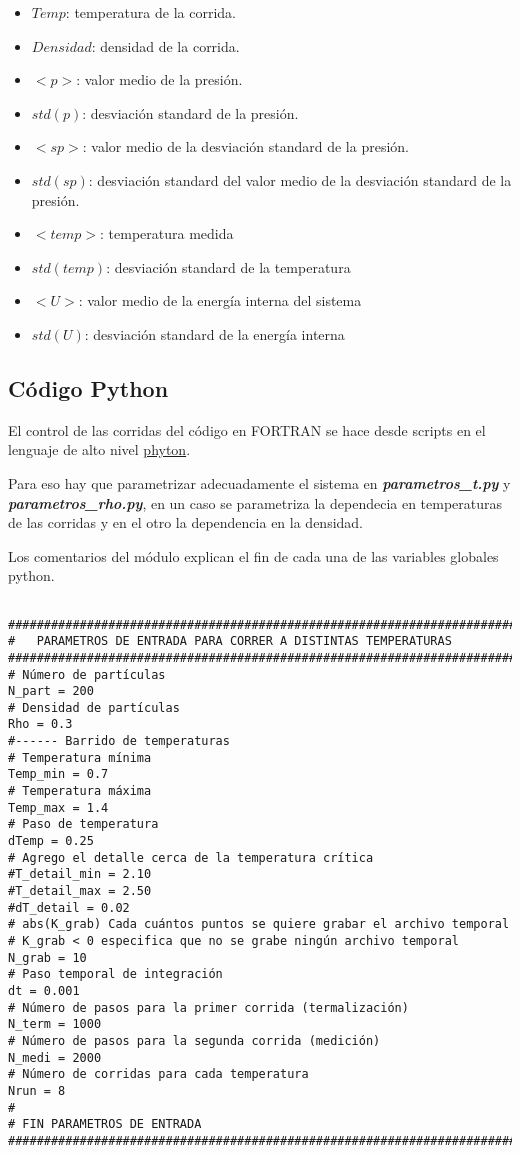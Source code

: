 \begin{itemize}

\item $Temp$: temperatura de la corrida.      
\item $Densidad$: densidad de la corrida.       
\item $<p>$: valor medio de la presión.      
\item $std(p)$: desviación standard de la presión.       
\item $<sp>$: valor medio de la desviación standard de la presión.       
\item $std(sp)$: desviación standard del valor medio de la desviación standard de la presión.    
\item $<temp>$: temperatura medida      
\item $std(temp)$: desviación standard de la temperatura       
\item $<U>$: valor medio de la energía interna del sistema       
\item $std(U)$: desviación standard de la energía interna
\end{itemize}



\subsection{Código Python}

El control de las corridas del código en FORTRAN se hace desde scripts en el lenguaje
de alto nivel  \href{http://www.python.org/}{phyton}. 

Para eso hay que parametrizar adecuadamente el sistema en \textbf{\textit{parametros\_t.py}} y 
\textbf{\textit{parametros\_rho.py}}, en un caso se parametriza la dependecia en temperaturas
de las corridas y en el otro la dependencia en la densidad.
 
Los comentarios del módulo explican el fin de cada una de las variables globales python.

\begin{verbatim}

###############################################################################       
#   PARAMETROS DE ENTRADA PARA CORRER A DISTINTAS TEMPERATURAS
###############################################################################
# Número de partículas
N_part = 200
# Densidad de partículas
Rho = 0.3
#------ Barrido de temperaturas
# Temperatura mínima
Temp_min = 0.7
# Temperatura máxima
Temp_max = 1.4
# Paso de temperatura
dTemp = 0.25
# Agrego el detalle cerca de la temperatura crítica
#T_detail_min = 2.10
#T_detail_max = 2.50
#dT_detail = 0.02
# abs(K_grab) Cada cuántos puntos se quiere grabar el archivo temporal
# K_grab < 0 especifica que no se grabe ningún archivo temporal
N_grab = 10
# Paso temporal de integración
dt = 0.001
# Número de pasos para la primer corrida (termalización)
N_term = 1000
# Número de pasos para la segunda corrida (medición)
N_medi = 2000
# Número de corridas para cada temperatura
Nrun = 8
#
# FIN PARAMETROS DE ENTRADA
###############################################################################

\end{verbatim}

